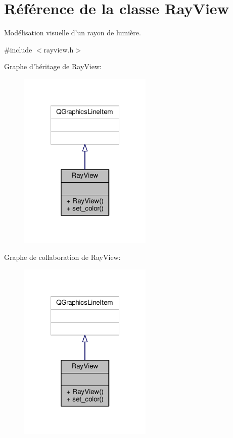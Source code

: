 \hypertarget{classRayView}{\section{Référence de la classe Ray\+View}
\label{classRayView}
}


Modélisation visuelle d’un rayon de lumière.  




{\ttfamily \#include $<$rayview.\+h$>$}



Graphe d'héritage de Ray\+View\+:
\nopagebreak
\begin{figure}[H]
\begin{center}
\leavevmode
\includegraphics[width=180pt]{d2/db9/classRayView__inherit__graph}
\end{center}
\end{figure}


Graphe de collaboration de Ray\+View\+:
\nopagebreak
\begin{figure}[H]
\begin{center}
\leavevmode
\includegraphics[width=180pt]{dd/dc8/classRayView__coll__graph}
\end{center}
\end{figure}
